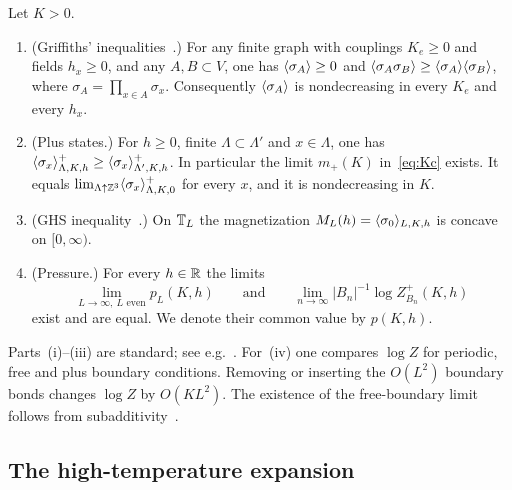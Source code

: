 \begin{lemma}\label{lem:standard}
Let $K>0$.
\begin{enumerate}
\item \textup{(Griffiths' inequalities~\cite{Gri67,KS68,Gin70}.)} For any finite graph with couplings $K_e\ge0$ and fields $h_x\ge0$, and any $A,B\subset V$, one has $\langle \sigma_A\rangle\ge0$ and $\langle \sigma_A\sigma_B\rangle\ge\langle \sigma_A\rangle\langle \sigma_B\rangle$, where $\sigma_A=\prod_{x\in A}\sigma_x$. Consequently $\langle \sigma_A\rangle$ is nondecreasing in every $K_e$ and every $h_x$.
\item \textup{(Plus states.)} For $h\ge0$, finite $\Lambda\subset\Lambda'$ and $x\in\Lambda$, one has $\langle \sigma_x\rangle^+_{\Lambda,K,h}\ge\langle \sigma_x\rangle^+_{\Lambda',K,h}$. In particular the limit $m_+(K)$ in~\eqref{eq:Kc} exists. It equals $\lim_{\Lambda\uparrow\mathbb Z^3}\langle \sigma_x\rangle^+_{\Lambda,K,0}$ for every $x$, and it is nondecreasing in $K$.
\item \textup{(GHS inequality~\cite{GHS70}.)} On $\mathbb T_L$ the magnetization $M_L(h)=\langle \sigma_0\rangle_{L,K,h}$ is concave on $[0,\infty)$.
\item \textup{(Pressure.)} For every $h\in\mathbb R$ the limits
\[
 \lim_{L\to\infty,\ L\text{ even}}p_L(K,h)\qquad\text{and}\qquad\lim_{n\to\infty}|B_n|^{-1}\log Z^+_{B_n}(K,h)
\]
exist and are equal. We denote their common value by $p(K,h)$.
\end{enumerate}
\end{lemma}

Parts~(i)--(iii) are standard; see e.g.~\cite[Chap.~3]{FV17}. For~(iv) one compares $\log Z$ for periodic, free and plus boundary conditions. Removing or inserting the $O(L^2)$ boundary bonds changes $\log Z$ by $O(KL^2)$. The existence of the free-boundary limit follows from subadditivity~\cite[Sect.~3.2]{FV17}.

\subsection{The high-temperature expansion}\label{sec:HT}

